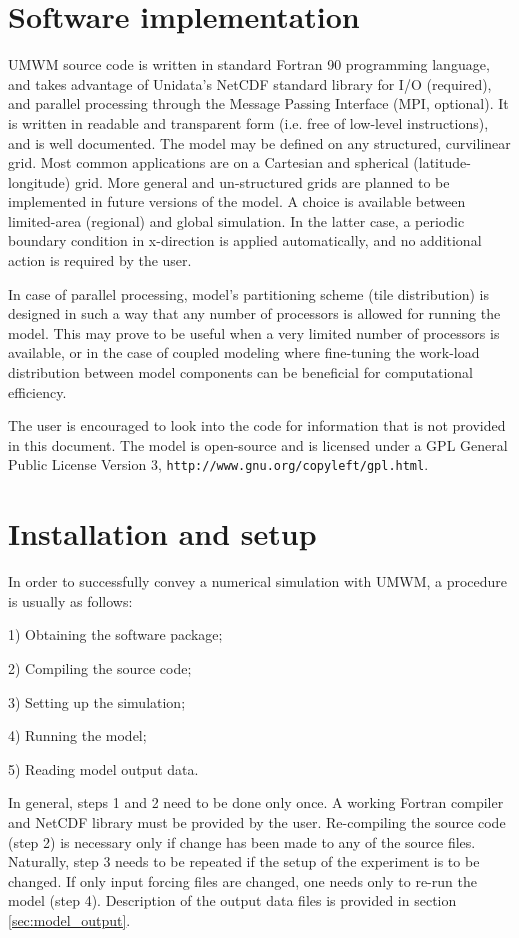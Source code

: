 \documentclass[letterpaper]{article}
\numberwithin{equation}{section}
\begin{document}
\newpage
\section{Software implementation}

UMWM source code is written in standard Fortran 90 programming language,
and takes advantage of Unidata's NetCDF standard library for I/O (required),
and parallel processing through the Message Passing Interface (MPI, optional). 
It is written in readable and transparent form 
(i.e. free of low-level instructions), and is well documented. 
The model may be defined on any structured, curvilinear grid. 
Most common applications are on a Cartesian and spherical (latitude-longitude) grid.
More general and un-structured grids are planned 
to be implemented in future versions of the model.
A choice is available between limited-area (regional) and global simulation.
In the latter case, a periodic boundary condition in x-direction is applied automatically,
and no additional action is required by the user.

In case of parallel processing, model's partitioning scheme (tile distribution)
is designed in such a way that any number of processors is allowed for running the model.
This may prove to be useful when a very limited number of processors is available,
or in the case of coupled modeling where fine-tuning the work-load distribution 
between model components can be beneficial for computational efficiency.

The user is encouraged to look into the code for information that is not provided in this document.
The model is open-source and is licensed under a GPL General Public License Version 3,
\verb+http://www.gnu.org/copyleft/gpl.html+.

\newpage
\section{Installation and setup}

In order to successfully convey a numerical simulation with UMWM, 
a procedure is usually as follows:

1) Obtaining the software package;

2) Compiling the source code;

3) Setting up the simulation;

4) Running the model;

5) Reading model output data.

In general, steps 1 and 2 need to be done only once. 
A working Fortran compiler and NetCDF library must be provided by the user.
Re-compiling the source code (step 2) is necessary only 
if change has been made to any of the source files. 
Naturally, step 3 needs to be repeated if the setup of the experiment is to be changed.
If only input forcing files are changed, one needs only to re-run the model (step 4).
Description of the output data files is provided in section \ref{sec:model_output}.
\end{document}
